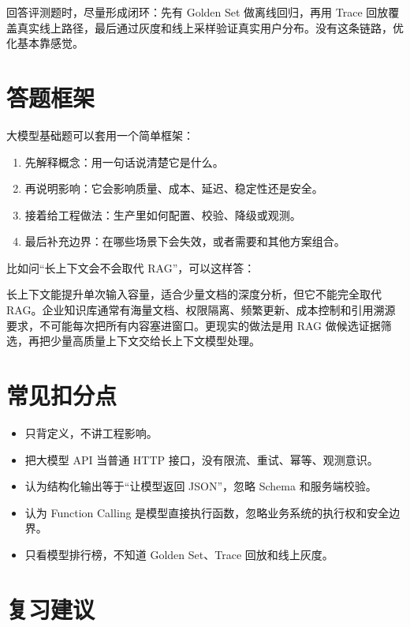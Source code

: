 \documentclass[10pt,a4paper]{ctexart}
\begin{document}
回答评测题时，尽量形成闭环：先有 Golden Set 做离线回归，再用 Trace 回放覆盖真实线上路径，最后通过灰度和线上采样验证真实用户分布。没有这条链路，优化基本靠感觉。



\section{答题框架}


大模型基础题可以套用一个简单框架：


\begin{enumerate}[itemsep=2pt, topsep=4pt]
  \item 先解释概念：用一句话说清楚它是什么。
  \item 再说明影响：它会影响质量、成本、延迟、稳定性还是安全。
  \item 接着给工程做法：生产里如何配置、校验、降级或观测。
  \item 最后补充边界：在哪些场景下会失效，或者需要和其他方案组合。
\end{enumerate}


比如问“长上下文会不会取代 RAG”，可以这样答：



长上下文能提升单次输入容量，适合少量文档的深度分析，但它不能完全取代 RAG。企业知识库通常有海量文档、权限隔离、频繁更新、成本控制和引用溯源要求，不可能每次把所有内容塞进窗口。更现实的做法是用 RAG 做候选证据筛选，再把少量高质量上下文交给长上下文模型处理。



\section{常见扣分点}

\begin{itemize}[itemsep=2pt, topsep=4pt]
  \item 只背定义，不讲工程影响。
  \item 把大模型 API 当普通 HTTP 接口，没有限流、重试、幂等、观测意识。
  \item 认为结构化输出等于“让模型返回 JSON”，忽略 Schema 和服务端校验。
  \item 认为 Function Calling 是模型直接执行函数，忽略业务系统的执行权和安全边界。
  \item 只看模型排行榜，不知道 Golden Set、Trace 回放和线上灰度。
\end{itemize}


\section{复习建议}
\end{document}
